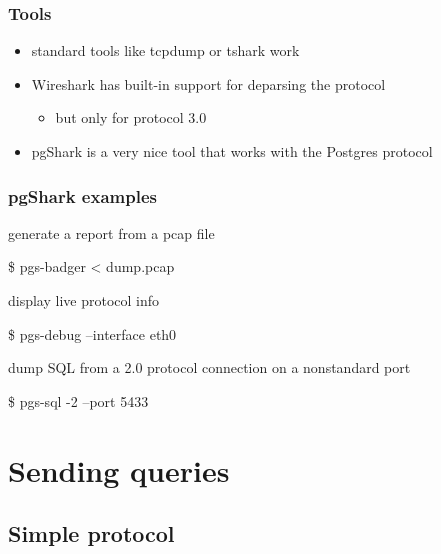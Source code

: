 \documentclass{beamer}
\begin{document}
\begin{frame}
  \frametitle{Tools}

  \begin{itemize}
    \item standard tools like tcpdump or tshark work
    \item Wireshark has built-in support for deparsing the protocol
      \begin{itemize}
      \item but only for protocol 3.0
      \end{itemize}
    \item pgShark is a very nice tool that works with the Postgres protocol
  \end{itemize}
\end{frame}

\begin{frame}[fragile]
  \frametitle{pgShark examples}

  \begin{block}{generate a report from a pcap file}
    \begin{semiverbatim}
    \$ pgs-badger < dump.pcap
    \end{semiverbatim}
  \end{block}

  \begin{block}{display live protocol info}
    \begin{semiverbatim}
    \$ pgs-debug --interface eth0
    \end{semiverbatim}
  \end{block}

  \begin{block}{dump SQL from a 2.0 protocol connection on a nonstandard port}
    \begin{semiverbatim}
    \$ pgs-sql -2 --port 5433
    \end{semiverbatim}
  \end{block}
\end{frame}

\section{Sending queries}
\subsection{Simple protocol}
\end{document}
